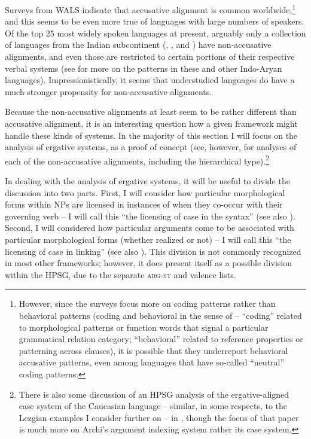\documentclass[output=paper]{langsci/langscibook}
\begin{document}
{Surveys from WALS \citep{comrieWALSalignfullnp,comrieWALSalignpro,siewierskaWALSalignvp} indicate that accusative alignment is common worldwide,\footnote{However, since the surveys focus more on coding patterns  rather than behavioral patterns  (coding and behavioral in the sense of \citealt{keenan76subjects} -- ``coding'' related to morphological patterns or function words that signal a particular grammatical relation category; ``behavioral'' related to reference properties or patterning across clauses), it is possible that they underreport behavioral accusative patterns, even among languages that have so-called ``neutral'' coding patterns.} and this seems to be even more true of languages with large numbers of speakers. Of the top 25 most widely spoken languages at present, arguably only a collection of languages from the Indian subcontinent (, , and ) have non-accusative alignments, and even those are restricted to certain portions of their respective verbal systems (see \citealt[Chapter 7]{verbeke13} for more on the patterns in these and other Indo-Aryan languages). Impressionistically, it seems that understudied languages do have a much stronger propensity for non-accusative alignments. 

Because the non-accusative alignments at least seem to be rather different than accusative alignment, it is an interesting question how a given framework might handle these kinds of systems. In the majority of this section I will focus on the analysis of ergative systems, as a proof of concept (see, however, \citealt{Drellishak2009a-u} for analyses of each of the non-accusative alignments, including the hierarchical type).\footnote{There is also some discussion of an HPSG analysis of the ergative-aligned case system of the Caucasian language  -- similar, in some respects, to the Lezgian examples I consider further on -- in \citealt{borsley16}, though the focus of that paper is much more on Archi's argument indexing system rather its case system.}

In dealing with the analysis of ergative systems, it will be useful to divide the discussion into two parts. First, I will consider how particular morphological forms within NPs are licensed in instances of when they co-occur with their governing verb  -- I will call this ``the licensing of case in the syntax'' (see also ). Second, I will considered how particular arguments come to be associated with particular morphological forms (whether realized or not) -- I will call this ``the licensing of case in linking''  (see also ). This division is not commonly recognized in most other frameworks; however, it does present itself as a possible division within the HPSG, due to the separate \textsc{arg-st} and valence lists. 

}
\end{document}
